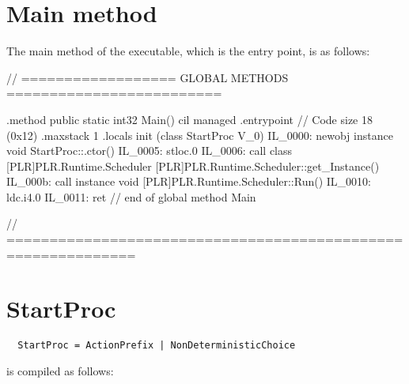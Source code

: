   \section{Main method}
  
	The main method of the executable, which is the entry point, is as follows:
	
	\begin{cil}
// ================== GLOBAL METHODS =========================

.method public static int32  Main() cil managed
{
  .entrypoint
  // Code size       18 (0x12)
  .maxstack  1
  .locals init (class StartProc V_0)
  IL_0000:  newobj     instance void StartProc::.ctor()
  IL_0005:  stloc.0
  IL_0006:  call       class [PLR]PLR.Runtime.Scheduler 
                       [PLR]PLR.Runtime.Scheduler::get_Instance()
  IL_000b:  call       instance void [PLR]PLR.Runtime.Scheduler::Run()
  IL_0010:  ldc.i4.0
  IL_0011:  ret
} // end of global method Main


// =============================================================

	\end{cil}	  
  \section{StartProc}
	\begin{verbatim}
  StartProc = ActionPrefix | NonDeterministicChoice 
	\end{verbatim}
	
	is compiled as follows:
	
